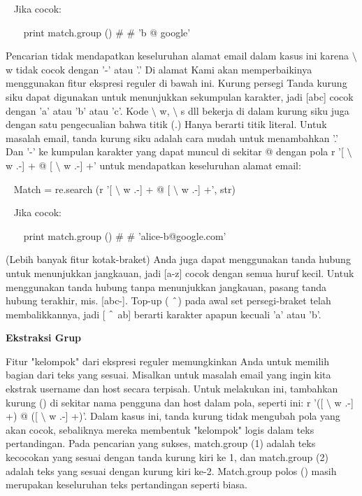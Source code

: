 \begin{12pt}
\begin{12pt}
~ Jika cocok: \par
\noindent 
~~~ print match.group ()  $  \#  $ $  \#  $ 'b @ google' \par
\vspace{12pt}
Pencarian tidak mendapatkan keseluruhan alamat email dalam kasus ini karena  $  \setminus  $ w tidak cocok dengan '-' atau '.' Di alamat Kami akan memperbaikinya menggunakan fitur ekspresi reguler di bawah ini. Kurung persegi Tanda kurung siku dapat digunakan untuk menunjukkan sekumpulan karakter, jadi [abc] cocok dengan 'a' atau 'b' atau 'c'. Kode  $  \setminus  $ w,  $  \setminus  $ s dll bekerja di dalam kurung siku juga dengan satu pengecualian bahwa titik (.) Hanya berarti titik literal. Untuk masalah email, tanda kurung siku adalah cara mudah untuk menambahkan '.' Dan '-' ke kumpulan karakter yang dapat muncul di sekitar @ dengan pola r '[ $  \setminus  $ w .-] + @ [ $  \setminus  $ w .-] +' untuk mendapatkan keseluruhan alamat email: \par
\vspace{12pt}
\noindent 
~ Match = re.search (r '[ $  \setminus  $ w .-] + @ [ $  \setminus  $ w .-] +', str) \par
\noindent 
~ Jika cocok: \par
\noindent 
~~~ print match.group ()  $  \#  $ $  \#  $ 'alice-b@google.com' \par
\vspace{12pt}
(Lebih banyak fitur kotak-braket) Anda juga dapat menggunakan tanda hubung untuk menunjukkan jangkauan, jadi [a-z] cocok dengan semua huruf kecil. Untuk menggunakan tanda hubung tanpa menunjukkan jangkauan, pasang tanda hubung terakhir, mis. [abc-]. Top-up ( $  \string^  $) pada awal set persegi-braket telah membalikkannya, jadi [ $  \string^  $ ab] berarti karakter apapun kecuali 'a' atau 'b'. \par
\vspace{16pt}
{\fontsize{14pt}{14pt}\selectfont \textbf{Ekstraksi Grup} \\} \par
Fitur "kelompok" dari ekspresi reguler memungkinkan Anda untuk memilih bagian dari teks yang sesuai. Misalkan untuk masalah email yang ingin kita ekstrak username dan host secara terpisah. Untuk melakukan ini, tambahkan kurung () di sekitar nama pengguna dan host dalam pola, seperti ini: r '([ $  \setminus  $ w .-] +) @ ([ $  \setminus  $ w .-] +)'. Dalam kasus ini, tanda kurung tidak mengubah pola yang akan cocok, sebaliknya mereka membentuk "kelompok" logis dalam teks pertandingan. Pada pencarian yang sukses, match.group (1) adalah teks kecocokan yang sesuai dengan tanda kurung kiri ke 1, dan match.group (2) adalah teks yang sesuai dengan kurung kiri ke-2. Match.group polos () masih merupakan keseluruhan teks pertandingan seperti biasa. \par

\end{12pt}
\end{12pt}
